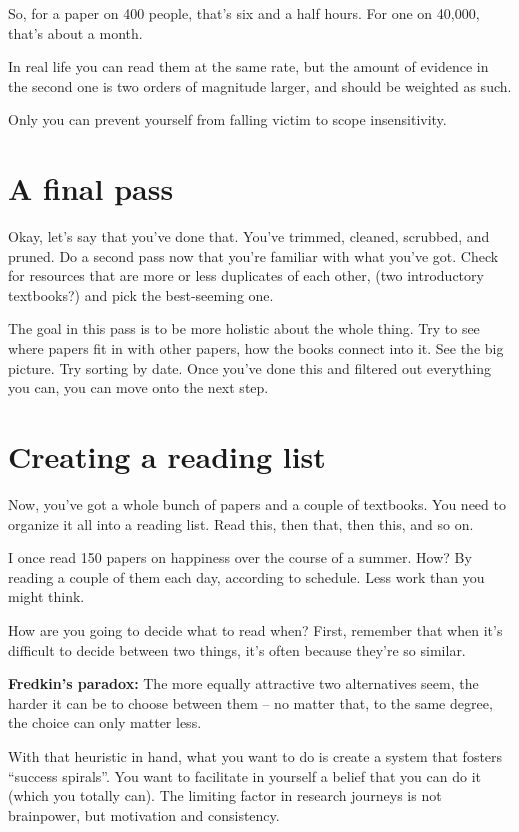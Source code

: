 So, for a paper on 400 people, that's six and a half hours. For one on 40,000,
that's about a month.

In real life you can read them at the same rate, but the amount of
evidence in the second one is two orders of magnitude larger, and should be
weighted as such.

Only you can prevent yourself from falling victim to scope insensitivity.


\section{A final pass}

Okay, let's say that you've done that. You've trimmed, cleaned, scrubbed, and
pruned. Do a second pass now that you're familiar with what you've got. Check for resources
that are more or less duplicates of each other,
(two introductory textbooks?) and pick the best-seeming one.

The goal in this pass is to be more holistic about the whole thing. Try to see
where papers fit in with other papers, how the books connect into it. See the
big picture. Try sorting by
date. Once you've done this and filtered out everything you can, you can move
onto the next step.

\section{Creating a reading list}

Now, you've got a whole bunch of papers and a couple of textbooks. You need to
organize it all into a reading list. Read this, then that, then this, and so on.

I once read 150 papers on happiness over the course of a summer. How? By reading
a couple of them each day, according to schedule. Less work than you might
think.

 How are you going to decide what to read when? First, remember that
when it's difficult to decide between two things, it's often because they're
so similar.

\textbf{Fredkin's paradox:} The more equally attractive two alternatives seem,
the harder it can be to choose between them -- no matter that, to the same
degree, the choice can only matter less.

With that heuristic in hand, what you want to do is create a system that fosters ``success spirals''. You want to facilitate in yourself a belief that you can do it (which
you totally can). The limiting factor in research journeys is not brainpower, but motivation and consistency.

